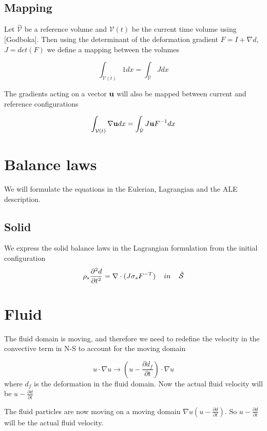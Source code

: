 \subsection*{Mapping}
Let $\hat{\mathcal{V}}$ be a reference volume and $\mathcal{V}(t)$ be the current time volume using [Godboka]. Then using the determinant of the deformation gradient $F = I+\nabla d $,  $J = det(F)$ we define a mapping between the volumes

$$  \int_{\mathcal{V}(t)} 1  dx = \int_{\hat{\mathcal{V}}} J dx  $$

The gradients acting on a vector $ \bold{u} $ will also be mapped between current and reference configurations

$$  \int_{\mathcal{V}(t)} \nabla \bold{u}   dx = \int_{\hat{\mathcal{V}}} J  \bold{u}F^{-1} dx  $$

\section*{Balance laws}
We will formulate the equations in the Eulerian, Lagrangian and the ALE description.

\subsection*{Solid}
We express the solid balance laws in the Lagrangian formulation from the initial configuration
$$\rho_s \frac{\partial^2 d}{\partial t^2} = \nabla \cdot (J \sigma_s F^{-T}) \hspace{4mm}in\hspace{4mm} \hat{\mathcal{S}} $$

\section*{Fluid}
The fluid domain is moving, and therefore we need to redefine the velocity in the convective term in N-S to account for the moving domain 

$$u \cdot \nabla u \rightarrow (u-\frac{\partial d_f}{\partial t}) \cdot \nabla u  $$ 
where $d_f$ is the deformation in the fluid domain. Now the actual fluid velocity will be $u-\frac{\partial d}{\partial t}$ 



The fluid particles are now moving on a moving domain $\nabla u (u-\frac{\partial d}{\partial t})$. So $u-\frac{\partial d}{\partial t}$ will be the actual fluid velocity.

